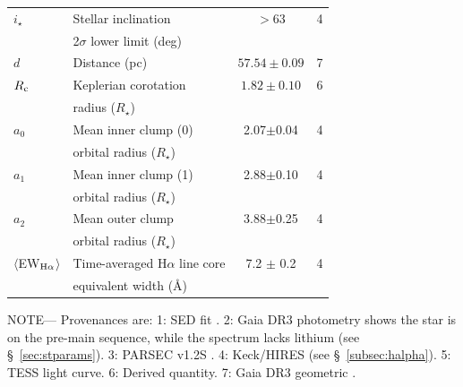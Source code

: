 \documentclass[11pt,twocolumn,tighten,linenumbers]{aastex7}
\begin{document}
\begin{table}
\begin{tabular}{llcc}
%
$i_\star$\dotfill                       & Stellar inclination\dotfill                                    & 	$>$63           & 4 \\
                                        & \hspace{3pt}  2$\sigma$ lower limit (deg)	                     &                      \\
%
$d$\dotfill                             & Distance (pc)\dotfill                                          & $57.54 \pm 0.09$ & 7 \\
%
$R_{\rm c}$\dotfill		                  & Keplerian corotation\dotfill                                   & $1.82 \pm 0.10$  & 6 \\
                                        & \hspace{3pt} radius ($R_\star$)	                               &                      \\
%
$a_0$\dotfill                           & Mean inner clump (0)\hspace{9pt}\dotfill           &  2.07$\pm$0.04   & 4 \\
                                        & \hspace{3pt} orbital radius ($R_\star$)	                       &                      \\
%
$a_1$\dotfill                           & Mean inner clump (1)\hspace{9pt}\dotfill           &  2.88$\pm$0.10   & 4 \\
                                        & \hspace{3pt} orbital radius ($R_\star$)	                       &                      \\
%
$a_2$\dotfill                           & Mean outer clump\hspace{9pt}\dotfill           &  3.88$\pm$0.25   & 4 \\
                                        & \hspace{3pt} orbital radius ($R_\star$)	                       &                      \\
%
$\langle$EW$_{\rm H\alpha}$$\rangle$    & Time-averaged H$\alpha$ line core                              &  7.2 $\pm$ 0.2   & 4 \\ 
                                        & \hspace{3pt} equivalent width (\AA)	                           &                      \\
\hline
\end{tabular}
\begin{flushleft}
\footnotesize{ \textsc{NOTE}---
Provenances are:
1: SED fit \citep{Bouma2024}.
2: Gaia DR3 photometry shows the star is on the pre-main sequence,
   while the spectrum lacks lithium (see \S~\ref{sec:stparams}).
3: PARSEC v1.2S \citep{Chen2014}.
4: Keck/HIRES (see \S~\ref{subsec:halpha}).
5: TESS light curve.
6: Derived quantity.
7: Gaia DR3 geometric \citep{GaiaDR3}.
}
\end{flushleft}
\vspace{-0.5cm}
\end{table}
\end{document}
